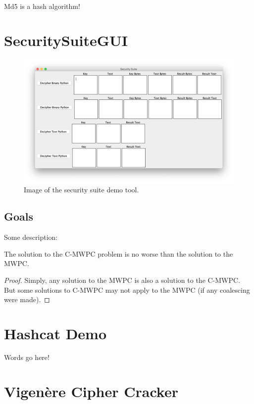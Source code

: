 \documentclass[acmlarge]{acmart}
\begin{document}
Md5 is a hash algorithm!

\section{SecuritySuiteGUI}\label{sec:gui}

\begin{figure}
  \includegraphics[scale=0.50]{demo}
  \caption{Image of the security suite demo tool.}
  \label{fig:one}
\end{figure}

\subsection{Goals}

Some description:

\begin{lemma}The solution to the C-MWPC problem is no
worse than the solution to the MWPC.
\end{lemma}
\begin{proof}
Simply, any solution to the MWPC is also a solution to the
C-MWPC. But some solutions to C-MWPC may not apply to the MWPC (if any
coalescing were made).
\end{proof}

\section{Hashcat Demo}\label{sec:hashcat}

Words go here!

\section{Vigenère Cipher Cracker}\label{sec:vinegar}
\end{document}
